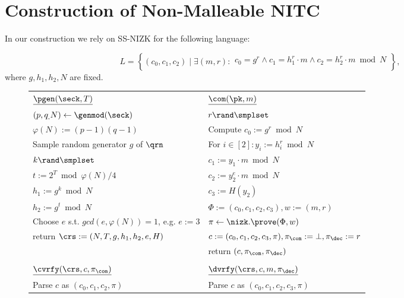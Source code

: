 \section{Construction of Non-Malleable NITC}
In our construction we rely on SS-NIZK for the following language: 

\[
L = \left\{(c_0, c_1, c_2) \mid \exists (m,r):
\begin{aligned}
      c_0 = g^r \land c_1 = h_1^r \cdot m \land c_2 = h_2^r \cdot m  \bmod N\\
    \end{aligned}
    \right\}, 
\]
where $g, h_1, h_2, N$ are fixed.




\begin{figure}[h!]
\begin{center}
\begin{tabular}{|ll|}
\hline
$\underline{\pgen(\seck, T)}$ 							   & $\underline{\com(\pk, m)}$ \\
$(p, q_, N) \leftarrow \genmod(\seck)$ & $r \rand \smplset$  \\
$\varphi(N):= (p-1)(q-1)$   & Compute $c_0:= g^r \bmod N$ \\
Sample random generator $g$ of $\qrn$ & For $i \in [2]: y_i:= h_i^r \bmod N$\\
$k \rand \smplset$ & $ c_1:= y_1 \cdot m \bmod N$ \\
$t:= 2^T \bmod \varphi(N)/4$ &  $c_2:= y_2^e \cdot m \bmod N$ \\
$h_1:= g^k \bmod N$ &  $c_3:=H(y_2)$\\
$h_2:=g^{t} \bmod N$ & $\Phi := (c_0, c_1, c_2,c_3), w := (m, r)$\\
Choose $e$ s.t. $gcd(e, \varphi(N)) =1$, e.g. $e:=3$ & $\pi \leftarrow \nizk.\prove(\Phi, w)$\\
return $\crs:= (N,T,g,h_1,h_2, e, H)$ & $c := (c_0, c_1, c_2,c_3, \pi), \pi_\com:= \bot, \pi_\dec: = r$\\
																			& return $(c, \pi_\com, \pi_\dec)$\\
                                             &\\
$\underline{\cvrfy(\crs, c, \pi_\com)}$     & $\underline{\dvrfy(\crs,c, m, \pi_\dec)}$ \\
Parse $c$ as $(c_0, c_1, c_2, \pi)$  & Parse $c$ as $(c_0, c_1, c_2, c_3, \pi)$ \\

\end{tabular}
\end{center}
\end{figure}
